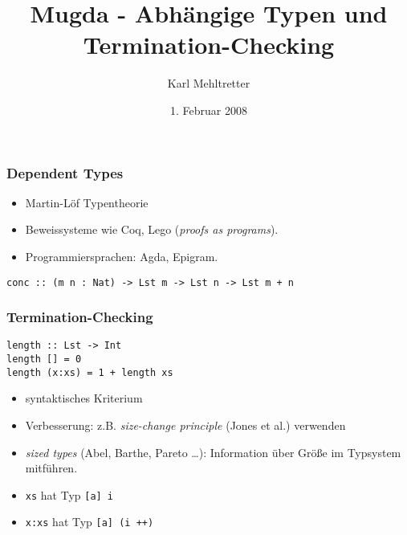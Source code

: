 \documentclass[12pt,red,serif,mathserif]{beamer}
\title{Mugda - Abh\"angige Typen und Termination-Checking}
\author{Karl Mehltretter}
\date{1. Februar 2008}
\begin{document}
\frame{\titlepage}



\begin{frame}[fragile]

  \frametitle{Dependent Types}

\begin{itemize}
\item
Martin-L\"of Typentheorie
\item
Beweissysteme wie Coq, Lego (\emph{proofs as programs}).
\item
Programmiersprachen: Agda, Epigram.
\end{itemize}
\vspace*{0.4cm}
\verb.conc :: (m n : Nat) -> Lst m -> Lst n -> Lst m + n.
\end{frame}

\begin{frame}[fragile]

  \frametitle{Termination-Checking}

\begin{verbatim}
length :: Lst -> Int
length [] = 0
length (x:xs) = 1 + length xs
\end{verbatim}

\begin{itemize}
\item
syntaktisches Kriterium
\item
Verbesserung: z.B. \emph{size-change principle} (Jones et al.) verwenden
\end{itemize}
\begin{itemize}
\item
\emph{sized types} (Abel, Barthe, Pareto \dots): Information \"uber Gr\"o\ss e im Typsystem mitf\"uhren.
\item
\verb+xs+ hat Typ \verb+[a] i+
\item
\verb+x:xs+ hat Typ \verb-[a] (i ++)-
\end{itemize}

\end{frame}
\end{document}
